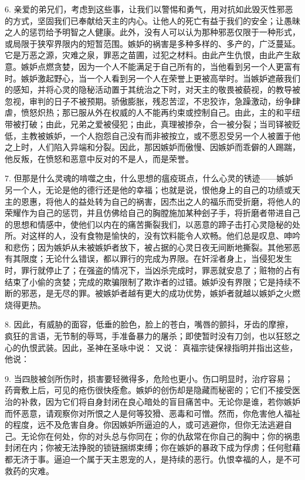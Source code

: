 6. 亲爱的弟兄们，考虑到这些事，让我们以警惕和勇气，用对抗如此毁灭性邪恶的方式，坚固我们已奉献给天主的内心。让他人的死亡有益于我们的安全；让愚昧之人的惩罚给予明智之人健康。此外，没有人可以认为那种邪恶仅限于一种形式，或局限于狭窄界限内的短暂范围。嫉妒的祸害是多种多样的、多产的，广泛蔓延。它是万恶之源，灾难之泉，罪恶之苗圃，过犯之材料。由此产生仇恨，由此产生敌意。嫉妒点燃贪婪，因为一个人不能满足于自己所有的，当他看到另一个人更富有时。嫉妒激起野心，当一个人看到另一个人在荣誉上更被高举时。当嫉妒遮蔽我们的感知，并将心灵的隐秘活动置于其统治之下时，对天主的敬畏被藐视，的教导被忽视，审判的日子不被预期。骄傲膨胀，残忍苦涩，不忠狡诈，急躁激动，纷争肆虐，愤怒炽热；那已服从外在权威的人不能再约束或控制自己。由此，主的和平纽带被打破；由此，兄弟之爱被侵犯；由此，真理被掺杂，合一被分裂；当司铎被贬低，主教被嫉妒，一个人抱怨自己没有而非被按立，或不愿忍受另一个人被置于他之上时，人们陷入异端和分裂。因此，那因嫉妒而傲慢、因嫉妒而乖僻的人踢踹，他反叛，在愤怒和恶意中反对的不是人，而是荣誉。\par

7. 但那是什么灵魂的啃噬之虫，什么思想的瘟疫斑点，什么心灵的锈迹——嫉妒另一个人，无论是他的德行还是他的幸福；也就是说，恨他身上的自己的功绩或天主的恩惠，将他人的益处转为自己的祸害，因杰出之人的福乐而受折磨，将他人的荣耀作为自己的惩罚，并且仿佛给自己的胸膛施加某种刽子手，将折磨者带进自己的思想和情感中，使他们以内在的痛苦撕裂我们，以恶意的蹄子击打心灵隐秘的处所。对这样的人，没有食物是愉快的，没有饮料能令人欢畅。他们总是叹息、呻吟和悲伤；因为嫉妒从未被嫉妒者放下，被占据的心灵日夜无间断地撕裂。其他邪恶有其限度；无论什么错误，都以罪行的完成为界限。在奸淫者身上，当侵犯发生时，罪行就停止了；在强盗的情况下，当凶杀完成时，罪恶就安息了；赃物的占有结束了小偷的贪婪；完成的欺骗限制了欺诈者的过错。嫉妒没有界限；它是持续不断的邪恶，是无尽的罪。被嫉妒者越有更大的成功优势，嫉妒者就越以嫉妒之火燃烧得更热。\par

8. 因此，有威胁的面容，低垂的脸色，脸上的苍白，嘴唇的颤抖，牙齿的摩擦，疯狂的言语，无节制的辱骂，手准备暴力的屠杀；即使暂时没有刀剑，也以狂怒之心的仇恨武装。因此，圣神在圣咏中说： 又说： 真福宗徒保禄指明并指出这些，他说：\par

9. 当四肢被剑所伤时，损害要轻微得多，危险也更小。伤口明显时，治疗容易；药膏敷上后，可见的疮伤很快痊愈。嫉妒的创伤却是隐藏而秘密的；它们不接受医治的补救，因为它们将自身封闭在良心暗处的盲目痛苦中。无论你是谁，若你嫉妒而怀恶意，请观察你对所恨之人是何等狡猾、恶毒和可憎。然而，你危害他人福祉的程度，远不及危害自身。你因嫉妒所逼迫的人，或可逃避你，但你无法逃避自己。无论你在何处，你的对头总与你同在；你的仇敌常在你自己的胸中；你的祸患封闭在内；你被无法挣脱的锁链捆绑束缚；你在嫉妒的暴政下成为俘虏；任何慰藉都无济于事。逼迫一个属于天主恩宠的人，是持续的恶行。仇恨幸福的人，是不可救药的灾难。\par

